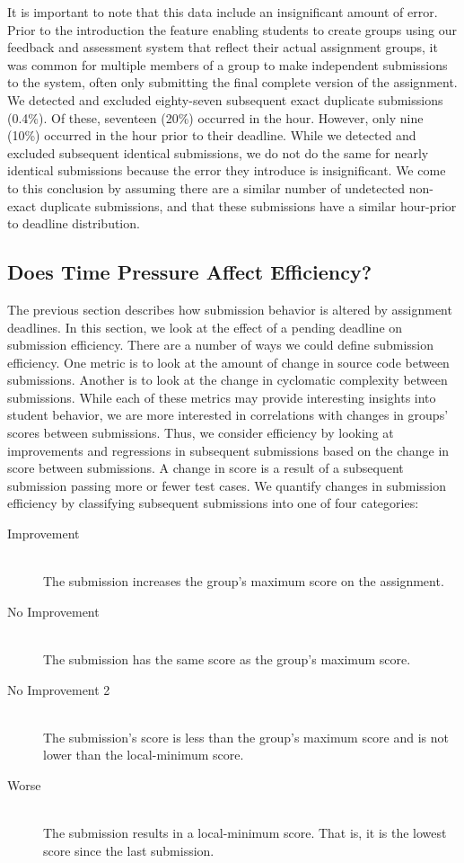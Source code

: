 It is important to note that this data include an insignificant amount of
error. Prior to the introduction the feature enabling students to create groups
using our feedback and assessment system that reflect their actual assignment
groups, it was common for multiple members of a group to make independent
submissions to the system, often only submitting the final complete version of
the assignment. We detected and excluded eighty-seven subsequent exact
duplicate submissions (0.4\%). Of these, seventeen (20\%) occurred in the
 hour. However, only nine (10\%) occurred in the hour prior to their
deadline. While we detected and excluded subsequent identical submissions, we
do not do the same for nearly identical submissions because the error they
introduce is insignificant. We come to this conclusion by assuming there are a
similar number of undetected non-exact duplicate submissions, and that these
submissions have a similar hour-prior to deadline distribution.

\subsection{Does Time Pressure Affect Efficiency?}

The previous section describes how submission behavior is altered by assignment
deadlines. In this section, we look at the effect of a pending deadline on
submission efficiency. There are a number of ways we could define submission
efficiency. One metric is to look at the amount of change in source code
between submissions. Another is to look at the change in cyclomatic complexity
between submissions. While each of these metrics may provide interesting
insights into student behavior, we are more interested in correlations with
changes in groups' scores between submissions. Thus, we consider efficiency by
looking at improvements and regressions in subsequent submissions based on the
change in score between submissions. A change in score is a result of a
subsequent submission passing more or fewer test cases. We quantify changes in
submission efficiency by classifying subsequent submissions into one of four
categories:

\begin{description}
  \item[Improvement] \hfill \\ The submission increases the group's maximum
    score on the assignment.
  \item[No Improvement] \hfill \\ The submission has the same score as the
    group's maximum score.
  \item[No Improvement 2] \hfill \\ The submission's score is less than the
    group's maximum score and is not lower than the local-minimum score.
  \item[Worse] \hfill \\ The submission results in a local-minimum score. That
    is, it is the lowest score since the last \imp{} submission.
\end{description}

